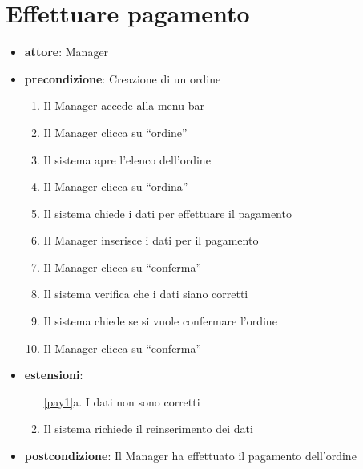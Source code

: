 \section{Effettuare pagamento}
\begin{itemize}
    \item \textbf{attore}: Manager
    \item \textbf{precondizione}: Creazione di un ordine
    
    \begin{enumerate}
        \item Il Manager accede alla menu bar
        \item Il Manager clicca su “ordine”
        \item Il sistema apre l’elenco dell’ordine 
        \item Il Manager clicca su “ordina”
        \item Il sistema chiede i dati per effettuare il pagamento
        \item Il Manager inserisce i dati per il pagamento
        \item Il Manager clicca su “conferma”
        \item Il sistema verifica che i dati siano corretti
        \label{pay1}
        \item Il sistema chiede se si vuole confermare l’ordine
        \item Il Manager clicca su “conferma”
    \end{enumerate}
    
    \item \textbf{estensioni}:
    \begin{enumerate}
        \item[\ref{pay1}a.] I dati non sono corretti
        \item Il sistema richiede il reinserimento dei dati
    \end{enumerate}

    \item \textbf{postcondizione}: Il Manager ha effettuato il pagamento dell’ordine
\end{itemize}


